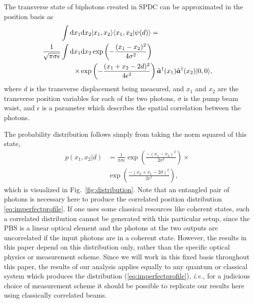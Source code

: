 The transverse state of biphotons created in SPDC can be approximated in the position basis as \cite{Schneeloch2015}
\begin{align}\label{eq:biphotonket}
\nonumber	\int  \text{d}x_1 \text{d}x_2 & \lvert x_1,x_2\rangle \langle x_1,x_2 \vert \psi(d) \rangle =  \\ 
\nonumber \frac{1}{\sqrt{\pi\sigma\epsilon}} \int \text{d}x_1 \text{d}x_2 & \exp\left(-\frac{(x_1 - x_2)^2}{4\sigma^2} \right) \\ 	
  \times \exp & \left(-\frac{(x_1 + x_2 - 2d)^2}{4\epsilon^2}\right) \hat{\bm a}^\dagger(x_1) \hat{\bm a}^\dagger(x_2)\lvert 0,0\rangle,
\end{align}
where $d$ is the transverse displacement being measured, and $x_1$ and $x_2$ are the transverse position variables for each of the two photons, $\sigma$ is the pump beam waist, and $\epsilon$ is a parameter which describes the spatial correlation between the photons.

The probability distribution follows simply from taking the norm squared of this state,
\begin{align}\label{eq:imperfectprofile}
\nonumber p({x_1,x_2}|d) &= \frac{1}{\pi\sigma\epsilon}\exp\left(\frac{-(x_{1} - x_{2})^2}{2\sigma^2}\right)\times \\
&\exp\left(\frac{-(x_{2} + x_{1} - 2d)^2}{2\epsilon^2}\right),
\end{align}
which is visualized in Fig.~\ref{fig:distribution}.
Note that an entangled pair of photons is necessary here to produce the correlated position distribution \eqref{eq:imperfectprofile}. If one uses some classical resources like coherent states, such a correlated distribution cannot be generated with this particular setup, since the PBS is a linear optical element and the photons at the two outputs are uncorrelated if the input photons are in a coherent state.
However, the results in this paper depend on this distribution only, rather than the specific optical physics or measurement scheme.
Since we will work in this fixed basis throughout this paper, the results of our analysis applies equally to any quantum or classical system which produces the distribution (\ref{eq:imperfectprofile}), \emph{i.e.,} for a judicious choice of measurement scheme it should be possible to replicate our results here using classically correlated beams.

